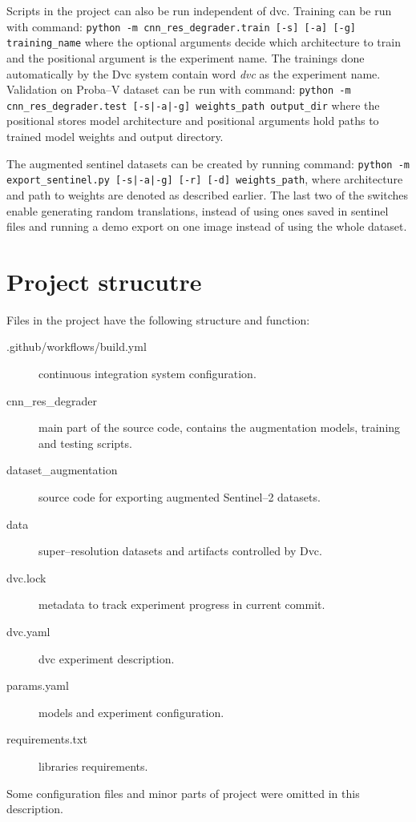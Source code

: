 Scripts in the project can also be run independent of dvc.
Training can be run with command: \texttt{python -m cnn_res_degrader.train [-s] [-a] [-g] training_name} where the optional arguments decide which architecture to train and the positional argument is the experiment name.
The trainings done automatically by the Dvc system contain word \textit{dvc} as the experiment name.
Validation on Proba--V dataset can be run with command: \texttt{python -m cnn_res_degrader.test [-s|-a|-g] weights_path output_dir} where the positional stores model architecture and positional arguments hold paths to trained model weights and output directory.

The augmented sentinel datasets can be created by running command: \texttt{python -m export_sentinel.py [-s|-a|-g] [-r] [-d] weights_path}, where architecture and path to weights are denoted as described earlier.
The last two of the switches enable generating random translations, instead of using ones saved in sentinel files and running a demo export on one image instead of using the whole dataset.

\section{Project strucutre}
Files in the project have the following structure and function:
\begin{description}
	\item[.github/workflows/build.yml] continuous integration system configuration.
	\item[cnn\_res\_degrader] main part of the source code, contains the augmentation models, training and testing scripts.
	\item[dataset\_augmentation] source code for exporting augmented Sentinel--2 datasets.
	\item[data] super--resolution datasets and artifacts controlled by Dvc.
	\item[dvc.lock] metadata to track experiment progress in current commit.
	\item[dvc.yaml] dvc experiment description.
	\item[params.yaml] models and experiment configuration.
	\item[requirements.txt] libraries requirements.
\end{description}
Some configuration files and minor parts of project were omitted in this description.

